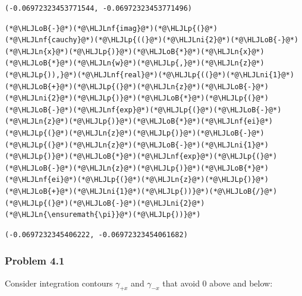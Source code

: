 \documentclass[12pt,a4paper]{article}
\newcommand{\HLJLn}[1]{#1}
\newcommand{\HLJLnf}[1]{\textcolor[RGB]{66,102,213}{#1}}
\newcommand{\HLJLni}[1]{\textcolor[RGB]{59,151,46}{#1}}
\newcommand{\HLJLoB}[1]{\textcolor[RGB]{102,102,102}{\textbf{#1}}}
\newcommand{\HLJLp}[1]{#1}
\begin{document}
\begin{lstlisting}
(-0.06972323453771544, -0.06972323453771496)
\end{lstlisting}


\begin{lstlisting}
(*@\HLJLoB{-}@*)(*@\HLJLnf{imag}@*)(*@\HLJLp{(}@*)(*@\HLJLnf{cauchy}@*)(*@\HLJLp{((}@*)(*@\HLJLni{2}@*)(*@\HLJLoB{-}@*)(*@\HLJLn{x}@*)(*@\HLJLp{)}@*)(*@\HLJLoB{*}@*)(*@\HLJLn{x}@*)(*@\HLJLoB{*}@*)(*@\HLJLn{w}@*)(*@\HLJLp{,}@*)(*@\HLJLn{z}@*)(*@\HLJLp{)),}@*)(*@\HLJLnf{real}@*)(*@\HLJLp{((}@*)(*@\HLJLni{1}@*)(*@\HLJLoB{+}@*)(*@\HLJLp{(}@*)(*@\HLJLn{z}@*)(*@\HLJLoB{-}@*)(*@\HLJLni{2}@*)(*@\HLJLp{)}@*)(*@\HLJLoB{*}@*)(*@\HLJLp{(}@*)(*@\HLJLoB{-}@*)(*@\HLJLnf{exp}@*)(*@\HLJLp{(}@*)(*@\HLJLoB{-}@*)(*@\HLJLn{z}@*)(*@\HLJLp{)}@*)(*@\HLJLoB{*}@*)(*@\HLJLnf{ei}@*)(*@\HLJLp{(}@*)(*@\HLJLn{z}@*)(*@\HLJLp{)}@*)(*@\HLJLoB{-}@*)(*@\HLJLp{(}@*)(*@\HLJLn{z}@*)(*@\HLJLoB{-}@*)(*@\HLJLni{1}@*)(*@\HLJLp{)}@*)(*@\HLJLoB{*}@*)(*@\HLJLnf{exp}@*)(*@\HLJLp{(}@*)(*@\HLJLoB{-}@*)(*@\HLJLn{z}@*)(*@\HLJLp{)}@*)(*@\HLJLoB{*}@*)(*@\HLJLnf{ei}@*)(*@\HLJLp{(}@*)(*@\HLJLn{z}@*)(*@\HLJLp{)}@*)(*@\HLJLoB{+}@*)(*@\HLJLni{1}@*)(*@\HLJLp{))}@*)(*@\HLJLoB{/}@*)(*@\HLJLp{(}@*)(*@\HLJLoB{-}@*)(*@\HLJLni{2}@*)(*@\HLJLn{\ensuremath{\pi}}@*)(*@\HLJLp{))}@*)
\end{lstlisting}

\begin{lstlisting}
(-0.0697232345406222, -0.06972323454061682)
\end{lstlisting}


\subsubsection{Problem 4.1}
Consider integration contours $\gamma_{+x}$ and $\gamma_{-x}$ that avoid $0$ above and below:
\end{document}
